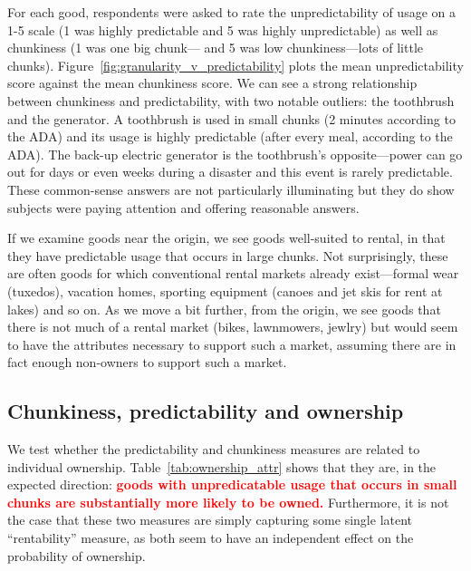 \documentclass[11pt]{article}
\newcommand{\important}[1]{\textcolor{red}{\textbf{#1}}}
\newcommand{\important}[1]{#1}
\begin{document}
For each good, respondents were asked to rate the unpredictability of usage on a 1-5 scale (1 was highly predictable and 5 was highly unpredictable) as well as chunkiness (1 was one big chunk--- and 5 was low chunkiness---lots of little chunks).  
Figure~\ref{fig:granularity_v_predictability} plots the mean unpredictability score against the mean chunkiness score. 
We can see a strong relationship between chunkiness and predictability, with two notable outliers: the toothbrush and the generator. 
A toothbrush is used in small chunks (2 minutes according to the ADA) and its usage is highly predictable (after every meal, according to the ADA).
The back-up electric generator is the toothbrush's opposite---power can go out for days or even weeks during a disaster and this event is rarely predictable. 
These common-sense answers are not particularly illuminating but they do show subjects were paying attention and offering reasonable answers. 

If we examine goods near the origin, we see goods well-suited to rental, in that they have predictable usage that occurs in large chunks. 
Not surprisingly, these are often goods for which conventional rental markets already exist---formal wear (tuxedos), vacation homes, sporting equipment (canoes and jet skis for rent at lakes) and so on.
As we move a bit further, from the origin, we see goods that there is not much of a rental market (bikes, lawnmowers, jewlry) but would seem to have the attributes necessary to support such a market, assuming there are in fact enough non-owners to support such a market.  

\subsection{Chunkiness, predictability and ownership} 

We test whether the predictability and chunkiness measures are related to individual ownership. 
Table~\ref{tab:ownership_attr} shows that they are, in the expected direction:
\important{goods with unpredicatable usage that occurs in small chunks are substantially more likely to be owned.}
Furthermore, it is not the case that these two measures are simply capturing some single latent ``rentability'' measure, as both seem to have an independent effect on the probability of ownership. 

 
\end{document}
